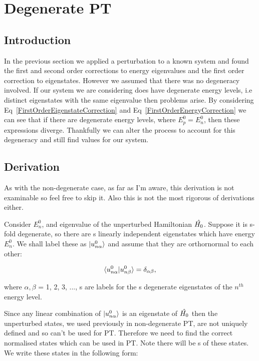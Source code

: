\chapter{Degenerate PT}
\label{chapt2} 

\section{Introduction}

In the previous section we applied a perturbation to a known system and found the first and second order corrections to energy eigenvalues and the first order correction to eigenstates. However we assumed that there was no degeneracy involved. If our system we are considering does have degenerate energy levels, i.e distinct eigenstates with the same eigenvalue then problems arise. By considering Eq~\ref{FirstOrderEigenstateCorrection} and Eq~\ref{FirstOrderEnergyCorrection} we can see that if there are degenerate energy levels, where $E^0_p = E^0_n$, then these expressions diverge. Thankfully we can alter the process to account for this degeneracy and still find values for our system.

\section{Derivation}

As with the non-degenerate case, as far as I'm aware, this derivation is not examinable so feel free to skip it. Also this is not the most rigorous of derivations either.

\noindent Consider $E^0_n$, and eigenvalue of the unperturbed Hamiltonian $\Hat{H_0}$. Suppose it is s-fold degenerate, so there are s linearly independent eigenstates which have energy $E^0_n$. We shall label these as $\ket{u^0_{n \alpha}}$ and assume that they are orthornormal to each other:

\begin{equation}
        \braket{u^0_{n \alpha} | u^0_{n \beta}} = \delta_{\alpha \beta},
    \label{DegenerateEigenfunctions}
\end{equation}

\noindent where $\alpha, \beta$ = 1, 2, 3, ..., s are labels for the s degenerate eigenstates of the $n^{th}$ energy level.

\noindent Since any linear combination of $\ket{u^0_{n \alpha}}$ is an eigenstate of $\Hat{H_0}$ then the unperturbed states, we used previously in non-degenerate PT, are not uniquely defined and so can't be used for PT. Therefore we need to find the correct normalised states which can be used in PT. Note there will be s of these states. We write these states in the following form:

